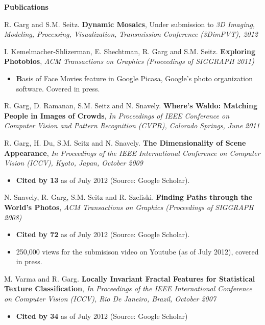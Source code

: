 \documentclass[10pt]{article}
\newenvironment{itemize*}%
  {\begin{itemize}%
    \setlength{\itemsep}{0pt}%
    \setlength{\parskip}{0pt}%
	}
  {\end{itemize}}
\begin{document}
{\large \textbf{Publications}}
\begin{itemize*}
\item R. Garg and S.M. Seitz. \textbf{Dynamic Mosaics}, Under submission to \emph{3D Imaging, Modeling, Processing, Visualization, Transmission Conference (3DimPVT), 2012}
\item I. Kemelmacher-Shlizerman, E. Shechtman, R. Garg and S.M. Seitz. \textbf{Exploring Photobios}, \emph{ACM Transactions on Graphics (Proceedings of SIGGRAPH 2011)}
	\begin{itemize}
	\item \textbf Basis of Face Movies feature in Google Picasa, Google's photo organization software. Covered in press.
	\end{itemize}
\item R. Garg, D. Ramanan, S.M. Seitz and N. Snavely. \textbf{Where's Waldo: Matching People in Images of Crowds}, \emph{In Proceedings of IEEE Conference on Computer Vision and Pattern Recognition (CVPR), Colorado Springs, June 2011}
\item R. Garg, H. Du, S.M. Seitz and N. Snavely. \textbf{The Dimensionality of Scene Appearance}, \emph{In Proceedings of the IEEE International Conference on Computer Vision (ICCV), Kyoto, Japan, October 2009}
	\begin{itemize}
	\item \textbf{Cited by 13} as of July 2012 (Source: Google Scholar).
	\end{itemize}
\item N. Snavely, R. Garg, S.M. Seitz and R. Szeliski. \textbf{Finding Paths through the World's Photos}, \emph{ACM Transactions on Graphics (Proceedings of SIGGRAPH 2008)}
	\begin{itemize}
	\item \textbf{Cited by 72} as of July 2012 (Source: Google Scholar).
	\item 250,000 views for the submisison video on Youtube (as of July 2012), covered in press.
	\end{itemize}
\item M. Varma and R. Garg. \textbf{Locally Invariant Fractal Features for Statistical Texture Classification}, \emph{In Proceedings of the IEEE International Conference on Computer Vision (ICCV), Rio De Janeiro, Brazil, October 2007} 
	\begin{itemize}
	\item \textbf{Cited by 34} as of July 2012 (Source: Google Scholar)
	\end{itemize}
\end{itemize*}
\end{document}
